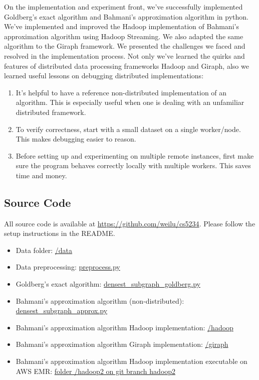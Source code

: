\documentclass{article}
\begin{document}
On the implementation and experiment front, we've successfully implemented Goldberg's exact algorithm and Bahmani's approximation algorithm in python. We've implemented and improved the Hadoop implementation of Bahmani's approximation algorithm using Hadoop Streaming. We also adapted the same algorithm to the Giraph framework. We presented the challenges we faced and resolved in the implementation process. Not only we've learned the quirks and features of distributed data processing frameworks Hadoop and Giraph, also we learned useful lessons on debugging distributed implementations:

\begin{enumerate}
  \item It's helpful to have a reference non-distributed implementation of an algorithm. This is especially useful when one is dealing with an unfamiliar distributed framework.
  \item To verify correctness, start with a small dataset on a single worker/node. This makes debugging easier to reason.
  \item Before setting up and experimenting on multiple remote instances, first make sure the program behaves correctly locally with multiple workers. This saves time and money.
\end{enumerate}

\newpage

\begin{appendices}
\section{Source Code}
All source code is available at \url{https://github.com/weilu/cs5234}. Please follow the setup instructions in the README.

\begin{itemize}
  \item Data folder: \href{https://github.com/weilu/cs5234/tree/master/data}{/data}
  \item Data preprocessing: \href{https://github.com/weilu/cs5234/blob/master/preprocess.py}{preprocess.py}
  \item Goldberg's exact algorithm: \href{https://github.com/weilu/cs5234/blob/master/densest_subgraph_goldberg.py}{densest\_subgraph\_goldberg.py}
  \item Bahmani's approximation algorithm (non-distributed): \href{https://github.com/weilu/cs5234/blob/master/densest_subgraph_approx.py}{densest\_subgraph\_approx.py}
  \item Bahmani's approximation algorithm Hadoop implementation: \href{https://github.com/weilu/cs5234/tree/master/hadoop}{/hadoop}
  \item Bahmani's approximation algorithm Giraph implementation: \href{https://github.com/weilu/cs5234/tree/master/giraph/}{/giraph}
  \item Bahmani's approximation algorithm Hadoop implementation executable on AWS EMR: \href{https://github.com/weilu/cs5234/tree/hadoop2/hadoop2}{folder /hadoop2 on git branch hadoop2}
\end{itemize}
\end{appendices}

\newpage

{}

\end{document}
